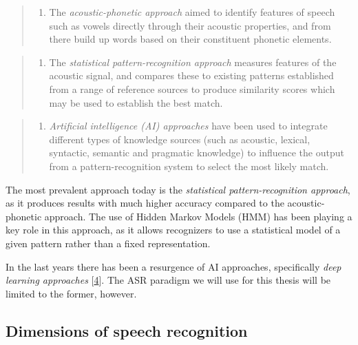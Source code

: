 \begin{quote}
\begin{enumerate}
\def\labelenumi{\arabic{enumi}.}
\tightlist
\item
  The \emph{acoustic-phonetic approach} aimed to identify features of
  speech such as vowels directly through their acoustic properties, and
  from there build up words based on their constituent phonetic
  elements.
\end{enumerate}
\end{quote}

\begin{quote}
\begin{enumerate}
\def\labelenumi{\arabic{enumi}.}
\setcounter{enumi}{1}
\tightlist
\item
  The \emph{statistical pattern-recognition approach} measures features
  of the acoustic signal, and compares these to existing patterns
  established from a range of reference sources to produce similarity
  scores which may be used to establish the best match.
\end{enumerate}
\end{quote}

\begin{quote}
\begin{enumerate}
\def\labelenumi{\arabic{enumi}.}
\setcounter{enumi}{2}
\tightlist
\item
  \emph{Artificial intelligence (AI) approaches} have been used to
  integrate different types of knowledge sources (such as acoustic,
  lexical, syntactic, semantic and pragmatic knowledge) to influence the
  output from a pattern-recognition system to select the most likely
  match.
\end{enumerate}
\end{quote}

The most prevalent approach today is the \emph{statistical
pattern-recognition approach}, as it produces results with much higher
accuracy compared to the acoustic-phonetic approach. The use of Hidden
Markov Models (HMM) has been playing a key role in this approach, as it
allows recognizers to use a statistical model of a given pattern rather
than a fixed representation.

In the last years there has been a resurgence of AI approaches,
specifically \emph{deep learning approaches}
{[}\hyperref[ref-hinton2012deep]{4}{]}. The ASR paradigm we will use for
this thesis will be limited to the former, however.

\subsection{Dimensions of speech
recognition}\label{dimensions-of-speech-recognition}

